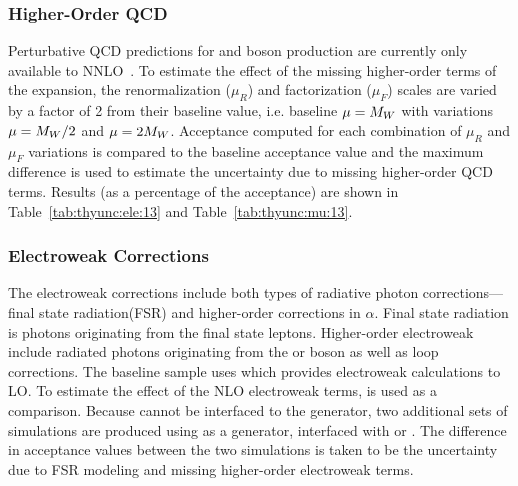 
\subsubsection{Higher-Order QCD}
Perturbative QCD predictions for \W and \Z boson production are currently only available to NNLO~\cite{Melnikov:2006kv,Catani:2009sm}. To estimate the effect of the missing higher-order terms of the expansion, the renormalization ($\mu_R$) and factorization ($\mu_F$) scales are varied by a factor of 2 from their baseline value, i.e. baseline $\mu = M_{W}$ with variations $\mu=M_{W}/2$ and $\mu=2M_{W}$. Acceptance computed for each combination of $\mu_R$ and $\mu_F$ variations is compared to the baseline acceptance value and the maximum difference is used to estimate the uncertainty due to missing higher-order QCD terms. Results (as a percentage of the acceptance) are shown in Table~\ref{tab:thyunc:ele:13} and Table~\ref{tab:thyunc:mu:13}.


\subsubsection{Electroweak Corrections}\label{ch:ewkcorr}
The electroweak corrections include both types of radiative photon corrections---final state radiation(FSR) and higher-order corrections in $\alpha$. Final state radiation is photons originating from the final state leptons. Higher-order electroweak include radiated photons originating from the \W or \Z boson as well as loop corrections. The baseline sample uses  which provides electroweak calculations to LO. To estimate the effect of the NLO electroweak terms, \PHOTOS \cite{Golonka:2005pn} is used as a comparison. Because \PHOTOS cannot be interfaced to the \aMCATNLO generator, two additional sets of simulations are produced using \POWHEG as a generator, interfaced with \PHOTOS or . The difference in acceptance values between the two simulations is taken to be the uncertainty due to FSR modeling and missing higher-order electroweak terms. 


% 
% 


% 


